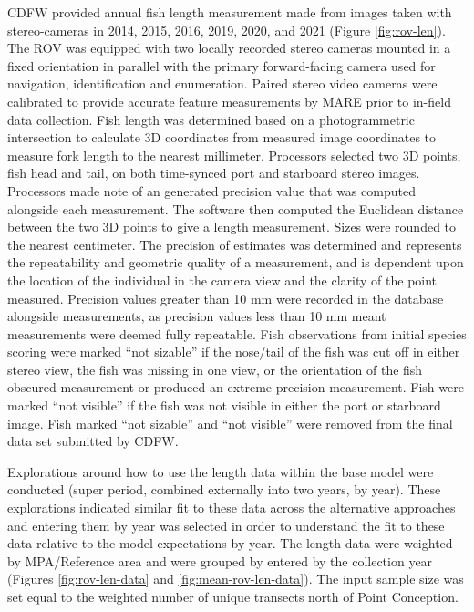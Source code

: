 \documentclass[11pt,
  english,
  letterpaper,
]{article}
\begin{document}
CDFW provided annual fish length measurement made from images taken with stereo-cameras in 2014, 2015, 2016, 2019, 2020, and 2021 (Figure \ref{fig:rov-len}). The ROV was equipped with two locally recorded stereo cameras mounted in a fixed orientation in parallel with the primary forward-facing camera used for navigation, identification and enumeration. Paired stereo video cameras were calibrated to provide accurate feature measurements by MARE prior to in-field data collection. Fish length was determined based on a photogrammetric intersection to calculate 3D coordinates from measured image coordinates to measure fork length to the nearest millimeter. Processors selected two 3D points, fish head and tail, on both time-synced port and starboard stereo images. Processors made note of an generated precision value that was computed alongside each measurement. The software then computed the Euclidean distance between the two 3D points to give a length measurement. Sizes were rounded to the nearest centimeter. The precision of estimates was determined and represents the repeatability and geometric quality of a measurement, and is dependent upon the location of the individual in the camera view and the clarity of the point measured. Precision values greater than 10 mm were recorded in the database alongside measurements, as precision values less than 10 mm meant measurements were deemed fully repeatable. Fish observations from initial species scoring were marked ``not sizable'' if the nose/tail of the fish was cut off in either stereo view, the fish was missing in one view, or the orientation of the fish obscured measurement or produced an extreme precision measurement. Fish were marked ``not visible'' if the fish was not visible in either the port or starboard image. Fish marked ``not sizable'' and ``not visible'' were removed from the final data set submitted by CDFW.

Explorations around how to use the length data within the base model were conducted (super period, combined externally into two years, by year). These explorations indicated similar fit to these data across the alternative approaches and entering them by year was selected in order to understand the fit to these data relative to the model expectations by year. The length data were weighted by MPA/Reference area and were grouped by entered by the collection year (Figures \ref{fig:rov-len-data} and \ref{fig:mean-rov-len-data}). The input sample size was set equal to the weighted number of unique transects north of Point Conception.
\end{document}
